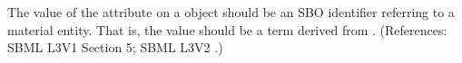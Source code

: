 The value of the attribute  on a \Species object should be
an SBO identifier referring to a material entity.  That is, the value
should be a term derived from \sbomaterialentity.  (References: SBML L3V1 Section 5; SBML L3V2
.)
